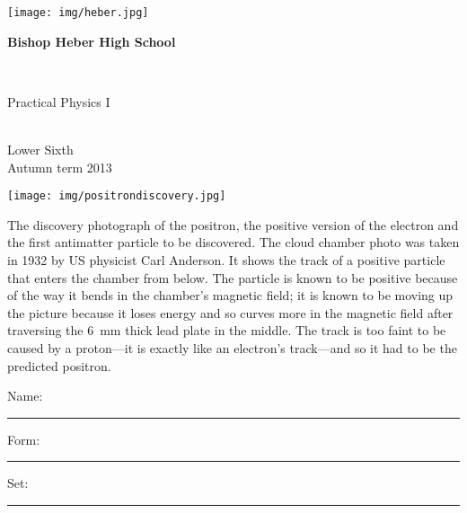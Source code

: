 \documentclass[a4paper,12pt,twoside]{exam}
\begin{document}
\begin{titlepage}

\begin{minipage}{0.2\textwidth}
\texttt{[image: img/heber.jpg]}
\end{minipage}
\hspace{0.05\textwidth}
\begin{minipage}{0.7\textwidth}
\begin{Huge}\textcolor{heberblue}{\textbf{Bishop Heber High School}}\end{Huge}
\end{minipage}\\

\bfseries

\vspace{6em}

\begin{Huge}Practical Physics I\end{Huge}\\
\indent \Large Lower Sixth\\

Autumn term 2013\\


\begin{minipage}{0.45\textwidth}
\hfill
\texttt{[image: img/positrondiscovery.jpg]} 
\hfill	
\end{minipage}
\begin{minipage}{0.45\textwidth}
\footnotesize{{
The discovery photograph of the positron, the positive version of the electron and the first antimatter particle to be discovered. The cloud chamber photo was taken in 1932 by US physicist Carl Anderson. It shows the track of a positive particle that enters the chamber from below. The particle is known to be positive because of the way it bends in the chamber's magnetic field; it is known to be moving up the picture because it loses energy and so curves more in the magnetic field after traversing the \SI{6}{mm} thick lead plate in the middle. The track is too faint to be caused by a proton---it is exactly like an electron's track---and so it had to be the predicted positron.
}}
\end{minipage}
\begin{flushright}
\end{flushright}

\vfill

\begin{minipage}{0.5\textwidth}
Name:\\
\hrule
\vspace{0.5em} Form: \\
\hrule
\vspace{0.5em} Set: \\
\hrule
\end{minipage}

\thispagestyle{empty}
	
\end{titlepage}
\end{document}
